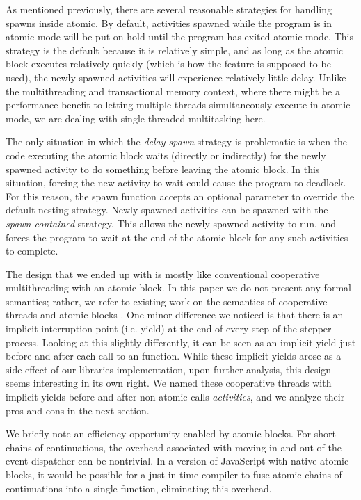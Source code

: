 \documentclass[acmsmall,anonymous,review]{acmart}\settopmatter{printfolios=true,printccs=false,printacmref=false}
\begin{document}
As mentioned previously, there are several reasonable strategies for handling spawns inside atomic.
By default, activities spawned while the program is in atomic mode will be put on hold until the program has exited atomic mode.
This strategy is the default because it is relatively simple, and as long as the atomic block executes relatively quickly (which is how the feature is supposed to be used), the newly spawned activities will experience relatively little delay.
Unlike the multithreading and transactional memory context, where there might be a performance benefit to letting multiple threads simultaneously execute in atomic mode, we are dealing with single-threaded multitasking here.

The only situation in which the \emph{delay-spawn} strategy is problematic is when the code executing the atomic block waits (directly or indirectly) for the newly spawned activity to do something before leaving the atomic block.
In this situation, forcing the new activity to wait could cause the program to deadlock.
For this reason, the spawn function accepts an optional parameter to override the default nesting strategy.
Newly spawned activities can be spawned with the \emph{spawn-contained} strategy.
This allows the newly spawned activity to run, and forces the program to wait at the end of the atomic block for any such activities to complete.

The design that we ended up with is mostly like conventional cooperative multithreading with an atomic block.
In this paper we do not present any formal semantics; rather, we refer to existing work on the semantics of cooperative threads \cite{Abadi2009} and atomic blocks \cite{Moore2008}.
One minor difference we noticed is that there is an implicit interruption point (i.e. yield) at the end of every step of the stepper process.
Looking at this slightly differently, it can be seen as an implicit yield just before and after each call to an \asyncs{} function.
While these implicit yields arose as a side-effect of our libraries implementation, upon further analysis, this design seems interesting in its own right.
We named these cooperative threads with implicit yields before and after non-atomic calls \emph{activities}, and we analyze their pros and cons in the next section.

We briefly note an efficiency opportunity enabled by atomic blocks.
For short chains of continuations, the overhead associated with moving in and out of the event dispatcher can be nontrivial.
In a version of JavaScript with native atomic blocks, it would be possible for a just-in-time compiler to fuse atomic chains of continuations into a single function, eliminating this overhead.
\end{document}
